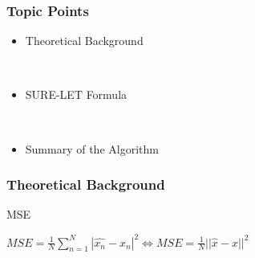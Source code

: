 \documentclass{beamer}
\begin{document}
	
	\begin{frame}
		\frametitle{Topic Points}
		\begin{itemize}
			\item  Theoretical Background
		
		\
		
			\item SURE-LET Formula 
			
			\
			
			\item Summary of the Algorithm

		
		\end{itemize}
	\end{frame}
	
	
	\begin{frame}
		\frametitle{Theoretical Background}
\begin{block}{MSE}

$MSE=\frac{1}{N}\displaystyle\sum_{n=1}^{N}|\hat{x_n}-x_n|^2 \Leftrightarrow MSE=\frac{1}{N}||\hat{x}-x||^2$ 
	\end{block}


	\end{frame}
	
\end{document}
